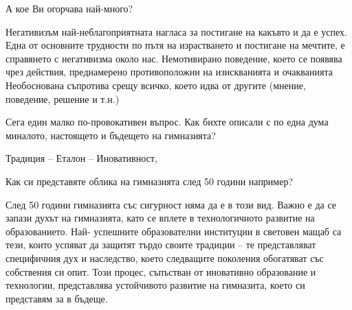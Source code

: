 \begin{multicols}{3}
А кое Ви огорчава най-много?

Негативизъм най-неблагоприятната нагласа за постигане на какъвто и да е успех. Една от основните трудности по пътя на израстването и постигане  на мечтите, е справянето с негативизма около нас. Немотивирано поведение, което се появява чрез действия, преднамерено противоположни на изискванията и очакванията Необоснована съпротива срещу всичко, което идва от другите (мнение, поведение, решение и т.н.)

Сега един малко по-провокативен въпрос. Как бихте описали с по една дума миналото, настоящето и бъдещето на гимназията?

Традиция – Еталон – Иновативност,

Как си представяте облика на гимназията след 50 години например?

След 50 години гимназията със сигурност няма да е в този вид. Важно е да се запази духът  на гимназията, като се вплете в технологичното развитие на образованието. Най- успешните образователни институции в световен мащаб са тези, които успяват да защитят търдо своите традиции – те представляват специфичния дух и наследство, което следващите поколения обогатяват със собствения си опит. Този процес, съпъстван от иновативно образование и технологии, представлява устойчивото развитие на гимназита, което си представям за в бъдеще.



\closearticle
\end{multicols}

